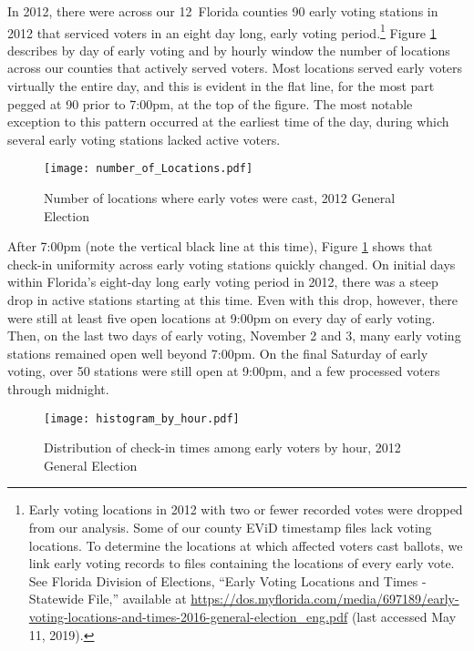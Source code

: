 \documentclass[12pt,titlepage]{article}
\newcommand{\numcounties}{12}
\begin{document}
In 2012, there were across our \numcounties\ Florida counties 90 early
voting stations in 2012 that serviced voters in an eight day long,
early voting period.\footnote{Early voting locations in 2012 with two
  or fewer recorded votes were dropped from our analysis.  Some of our
  county EViD timestamp files lack voting locations.  To determine the
  locations at which affected voters cast ballots, we link early
  voting records to files containing the locations of every early
  vote. See Florida Division of Elections, ``Early Voting Locations
  and Times - Statewide File,'' available at
  \url{https://dos.myflorida.com/media/697189/early-voting-locations-and-times-2016-general-election_eng.pdf}
  (last accessed May 11, 2019).}  Figure \ref{fig:nrlocs2012}
describes by day of early voting and by hourly window the number of
locations across our counties that actively served voters. Most
locations served early voters virtually the entire day, and this is
evident in the flat line, for the most part pegged at 90 prior to
7:00pm, at the top of the figure.  The most notable exception to this
pattern occurred at the earliest time of the day, during which several
early voting stations lacked active voters.


\begin{figure}[!ht]
  \caption{Number of locations where early votes were cast, 2012 General Election}
  \label{fig:nrlocs2012}
  \centering
    \centering\texttt{[image: number\_of\_Locations.pdf]}
\end{figure}

After 7:00pm (note the vertical black line at this time), Figure
\ref{fig:nrlocs2012} shows that check-in uniformity across early
voting stations quickly changed.  On initial days within Florida's
eight-day long early voting period in 2012, there was a steep drop in
active stations starting at this time.  Even with this drop, however,
there were still at least five open locations at 9:00pm on every day
of early voting.  Then, on the last two days of early voting, November
2 and 3, many early voting stations remained open well beyond 7:00pm.
On the final Saturday of early voting, over 50 stations were still
open at 9:00pm, and a few processed voters through midnight.

\begin{figure}[!ht]
\caption{Distribution of check-in times among early voters by hour, 2012 General Election}
  \label{fig:hist2012}
  \centering
    \centering\texttt{[image: histogram\_by\_hour.pdf]}
\end{figure}
\end{document}

